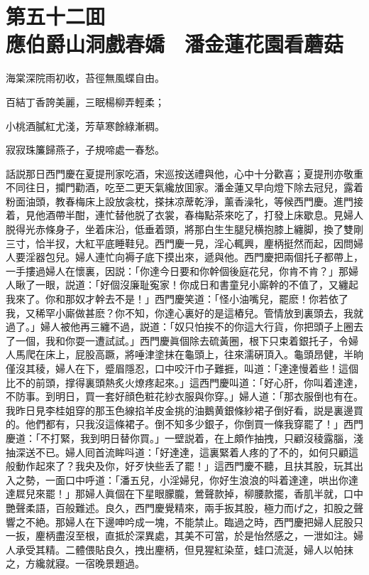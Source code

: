 
\chapter*{第五十二囬　\\應伯爵山洞戲春嬌　潘金蓮花園看蘑菇}


\begin{myquote}
海棠深院雨初收，苔徑無風蝶自由。

百結丁香誇美麗，三眠楊柳弄輕柔；

小桃酒膩紅尤淺，芳草寒餘綠漸稠。

寂寂珠簾歸燕子，子規啼處一春愁。
\end{myquote}

話説那日西門慶在夏提刑家吃酒，宋巡按送禮與他，心中十分歡喜；夏提刑亦敬重不同往日，攔門勸酒，吃至二更天氣纔放囬家。潘金蓮又早向燈下除去冠兒，露着粉面油頭，教春梅床上設放衾枕，搽抹凉蓆乾淨，薰香澡牝，等候西門慶。進門接着，見他酒帶半酣，連忙替他脱了衣裳，春梅點茶來吃了，打發上床歇息。見婦人脱得光赤條身子，坐着床沿，低垂着頭，將那白生生腿兒横抱膝上纏脚，換了雙剛三寸，恰半扠，大紅平底睡鞋兒。西門慶一見，淫心輒興，麈柄挺然而起，因問婦人要淫器包兒。婦人連忙向褥子底下摸出來，遞與他。西門慶把兩個托子都帶上，一手摟過婦人在懷裏，因説：「你達今日要和你幹個後庭花兒，你肯不肯？」那婦人瞅了一眼，説道：「好個沒廉耻寃家！你成日和書童兒小廝幹的不值了，又纏起我來了。你和那奴才幹去不是！」西門慶笑道：「怪小油嘴兒，罷麽！你若依了我，又稀罕小廝做甚麽？你不知，你達心裏好的是這樁兒。管情放到裏頭去，我就過了。」婦人被他再三纏不過，説道：「奴只怕挨不的你這大行貨，你把頭子上圈去了一個，我和你耍一遭試試。」西門慶眞個除去硫黃圈，根下只束着銀托子，令婦人馬爬在床上，屁股高蹶，將唾津塗抹在龜頭上，往來濡硏頂入。龜頭昂健，半晌僅沒其稜，婦人在下，蹙眉隱忍，口中咬汗巾子難捱，叫道：「達達慢着些！這個比不的前頭，撑得裏頭熱炙火燎疼起來。」這西門慶叫道：「好心肝，你叫着達達，不防事。到明日，買一套好顔色粧花紗衣服與你穿。」婦人道：「那衣服倒也有在。我昨日見李桂姐穿的那玉色線掐羊皮金挑的油鵝黄銀條紗裙子倒好看，説是裏邊買的。他們都有，只我沒這條裙子。倒不知多少銀子，你倒買一條我穿罷了！」西門慶道：「不打緊，我到明日替你買。」一壁説着，在上頗作抽拽，只顧沒稜露腦，淺抽深送不已。婦人囘首流眸呌道：「好達達，這裏緊着人疼的了不的，如何只顧這般動作起來了？我央及你，好歹快些丢了罷！」這西門慶不聽，且扶其股，玩其出入之勢，一面口中呼道：「潘五兒，小淫婦兒，你好生浪浪的呌着達達，哄出你達達㞞兒來罷！」那婦人眞個在下星眼朦朧，鶯聲款掉，柳腰款擺，香肌半就，口中艷聲柔語，百般難述。良久，西門慶覺精來，兩手扳其股，極力而げ之，扣股之聲響之不絶。那婦人在下邊呻吟成一塊，不能禁止。臨過之時，西門慶把婦人屁股只一扳，麈柄盡沒至根，直抵於深異處，其美不可當，於是怡然感之，一泄如注。婦人承受其精。二體偎貼良久，拽出麈柄，但見猩紅染莖，蛙口流涎，婦人以帕抹之，方纔就寢。一宿晚景題過。


